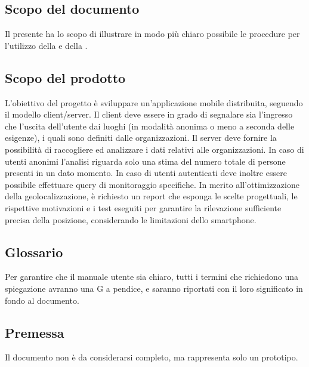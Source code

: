 \documentclass[../manuale-utente.tex]{subfiles}
\begin{document}
\subsection{Scopo del documento}%
\label{sub:scopo_del_documento}
Il presente  ha lo scopo di illustrare in modo più chiaro possibile le procedure per l'utilizzo della  e della .

\subsection{Scopo del prodotto}%
\label{sub:scopo_del_prodotto}
L'obiettivo del progetto è sviluppare un'applicazione mobile distribuita, seguendo il modello client/server.
Il client deve essere in grado di segnalare sia l'ingresso che l'uscita dell'utente dai luoghi (in modalità anonima o meno a seconda delle esigenze), i quali sono definiti dalle organizzazioni.
Il server deve fornire la possibilità di raccogliere ed analizzare i dati relativi alle organizzazioni.
In caso di utenti anonimi l'analisi riguarda solo una stima del numero totale di persone presenti in un dato momento.
In caso di utenti autenticati deve inoltre essere possibile effettuare query di monitoraggio specifiche.
In merito all'ottimizzazione della geolocalizzazione, è richiesto un report che esponga le scelte progettuali, le rispettive motivazioni e i test eseguiti per garantire la rilevazione sufficiente precisa della posizione, considerando le limitazioni dello smartphone.

\subsection{Glossario}%
\label{sub:glossario}
Per garantire che il manuale utente sia chiaro, tutti i termini che richiedono una spiegazione avranno una G a pendice, e saranno riportati con il loro significato in fondo al documento.

\subsection{Premessa}%
\label{sub:glossario}
Il documento non è da considerarsi completo, ma rappresenta solo un prototipo.
\end{document}
